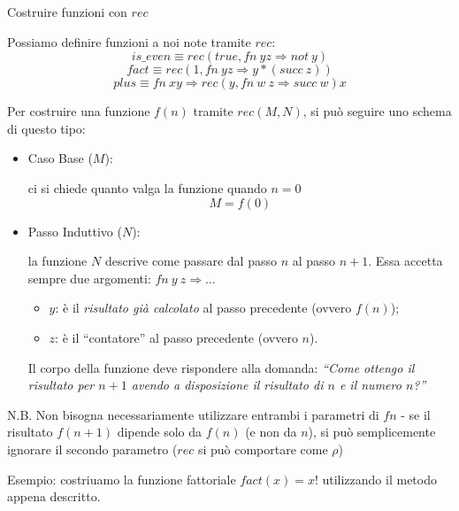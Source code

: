 \documentclass[a4paper,11pt]{report}
\begin{document}
\begin{gframe}{Costruire funzioni con \( rec \)}

Possiamo definire funzioni a noi note tramite \( rec \):
\[ is\_even \equiv rec(true, fn \ y z \Rightarrow not \ y) \]
\[ fact \equiv rec(1, fn \ yz \Rightarrow y * (succ \ z)) \]
\[ plus \equiv fn \ x y \Rightarrow rec(y, fn \ w \ z \Rightarrow succ \ w) x\]

Per costruire una funzione \( f(n) \) tramite \( rec(M, N) \), si può seguire uno schema di questo tipo:

\begin{itemize}
    \item Caso Base (\( M \)): 

    ci si chiede quanto valga la funzione quando \( n=0 \)
    \[ M = f(0)\]

    \item Passo Induttivo (\( N \)):

    la funzione \( N \) descrive come passare dal passo \( n \) al passo \( n+1 \).
    Essa accetta sempre due argomenti: \( fn \ y \ z \Rightarrow \dots \)
    \begin{itemize}
        \item \( y \): è il \textit{risultato già calcolato} al passo precedente (ovvero \( f(n) \));
        \item \( z \): è il ``contatore'' al passo precedente (ovvero \( n \)).
    \end{itemize}
    Il corpo della funzione deve rispondere alla domanda: \textit{``Come ottengo il risultato per \( n+1 \) avendo a disposizione il risultato di \( n \) e il numero \( n \)?''}
\end{itemize}

\begin{gframe}{N.B.}
    Non bisogna necessariamente utilizzare entrambi i parametri di \( fn \) - se il risultato \( f(n+1) \) dipende solo da \( f(n) \) (e non da \( n \)), si può semplicemente ignorare il secondo parametro (\( rec \) si può comportare come \( \rho \))
\end{gframe}

\end{gframe}

Esempio: costriuamo la funzione fattoriale \( fact(x) = x! \) utilizzando il metodo appena descritto.
\end{document}
